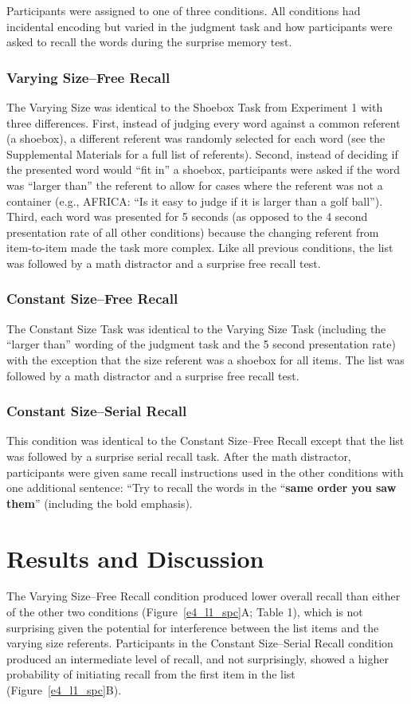 \documentclass[man,natbib,floatsintext]{apa6} %
\begin{document}
Participants were assigned to one of three conditions. All conditions had incidental encoding but varied in the judgment task and how participants were asked to recall the words during the surprise memory test.

\subsubsection{Varying Size--Free Recall}
The Varying Size  was identical to the Shoebox Task from Experiment 1 with three differences. First, instead of judging every word against a common referent (a shoebox), a different referent was randomly selected for each word (see the Supplemental Materials for a full list of referents). Second, instead of deciding if the presented word would ``fit in'' a shoebox, participants were asked if the word was ``larger than'' the referent to allow for cases where the referent was not a container (e.g., AFRICA: ``Is it easy to judge if it is larger than a golf ball''). Third, each word was presented for 5 seconds (as opposed to the 4 second presentation rate of all other conditions) because the changing referent from item-to-item made the task more complex. Like all previous conditions, the list was followed by a math distractor and a surprise free recall test.

\subsubsection{Constant Size--Free Recall}
The Constant Size Task was identical to the Varying Size Task (including the ``larger than'' wording of the judgment task and the 5 second presentation rate) with the exception that the size referent was a shoebox for all items. The list was followed by a math distractor and a surprise free recall test.

\subsubsection{Constant Size--Serial Recall} 
This condition was identical to the Constant Size--Free Recall except that the list was followed by a surprise serial recall task. After the math distractor, participants were given same recall instructions used in the other conditions with one additional sentence: ``Try to recall the words in the ``\textbf{same order you saw them}'' (including the bold emphasis).

\section{Results and Discussion}
The Varying Size--Free Recall condition produced lower overall recall than either of the other two conditions (Figure~\ref{e4_l1_spc}A; Table 1), which is not surprising given the potential for interference between the list items and the varying size referents. Participants in the Constant Size--Serial Recall condition produced an intermediate level of recall, and not surprisingly, showed a higher probability of initiating recall from the first item in the list (Figure~\ref{e4_l1_spc}B).
\end{document}
